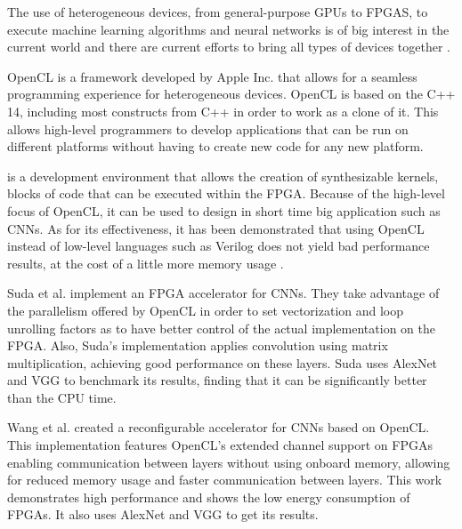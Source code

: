The use of heterogeneous devices, from general-purpose GPUs to FPGAS, to execute 
machine learning algorithms and neural networks
is of big interest in the current world and there are current efforts to bring
all types of devices together \cite{abadi2016tensorflow}.

OpenCL is a framework developed by Apple Inc. that allows for a seamless
programming experience for heterogeneous devices. OpenCL is based on 
the C++ 14, including most constructs from C++ in order to work as a
clone of it. This allows high-level programmers to develop applications
that can be run on different platforms without having to create new code
for any new platform.

\intelOCLnos is a development environment that allows the creation of
synthesizable kernels, blocks of code that can be executed within the FPGA.
Because of the high-level focus of OpenCL, it can be used to design in short
time big application such as CNNs. As for its effectiveness, it has been
demonstrated that using OpenCL instead of low-level languages such as Verilog
does not yield bad performance results, at the cost of a little more memory
usage \cite{abdelfattah2014gzip}.

Suda et al. \cite{suda} implement an FPGA accelerator for CNNs. They take advantage
of the parallelism offered by OpenCL in order to set vectorization and 
loop unrolling factors as to have better control of the actual implementation
on the FPGA. Also, Suda's implementation applies convolution using
matrix multiplication, achieving good performance on these layers. Suda
uses AlexNet and VGG to benchmark its results, finding that it can be
significantly better than the CPU time.

Wang et al. \cite{pipecnn} created a reconfigurable accelerator for CNNs
based on OpenCL. This implementation features OpenCL's extended channel support 
on FPGAs enabling communication between layers without using onboard memory, allowing
for reduced memory usage and faster communication between layers.
This work demonstrates high performance and shows the low energy consumption
of FPGAs. It also uses AlexNet and VGG to get its results.